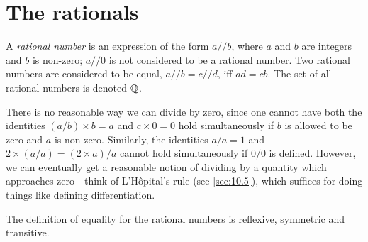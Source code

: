 \section{The rationals}\label{sec:4.2}

\begin{defn}\label{4.2.1}
  A \emph{rational number} is an expression of the form \(a // b\), where \(a\) and \(b\) are integers and \(b\) is non-zero;
  \(a // 0\) is not considered to be a rational number.
  Two rational numbers are considered to be equal, \(a // b = c // d\), iff \(ad = cb\).
  The set of all rational numbers is denoted \(\mathbb{Q}\).
\end{defn}

\begin{note}
  There is no reasonable way we can divide by zero, since one cannot have both the identities \((a / b) \times b = a\) and \(c \times 0 = 0\) hold simultaneously if \(b\) is allowed to be zero and \(a\) is non-zero.
  Similarly, the identities \(a / a = 1\) and \(2 \times (a / a) = (2 \times a) / a\) cannot hold simultaneously if \(0 / 0\) is defined.
  However, we can eventually get a reasonable notion of dividing by a quantity which approaches zero
  - think of L'H\^opital's rule (see \cref{sec:10.5}), which suffices for doing things like defining differentiation.
\end{note}

\begin{ac}\label{ac:4.2.1}
  The definition of equality for the rational numbers is reflexive, symmetric and transitive.
\end{ac}

